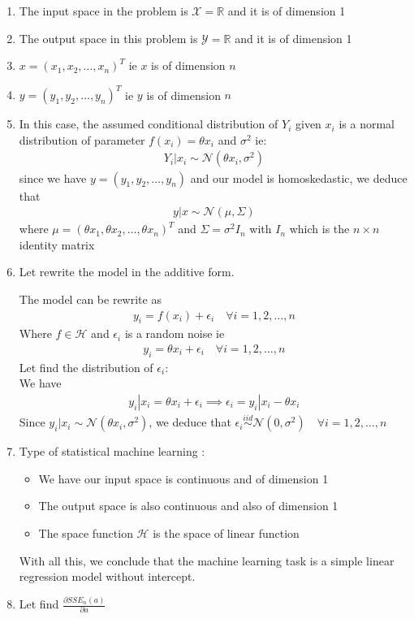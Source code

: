 \documentclass[12pt,a4paper]{article}
\begin{document}
\begin{enumerate}
	\item The input space in the problem is $\mathscr{X}=\mathbb{R}$ and it is of dimension 1
	\item The output space in this problem is $\mathscr{Y}=\mathbb{R}$ and it is of dimension 1
	\item $x = (x_{1},x_{2},\dots,x_{n})^{T}$ ie $x$ is of dimension $n$
	\item $y = (y_{1},y_{2},\dots,y_{n})^{T}$ ie $y$ is of dimension $n$
	\item In this case, the assumed conditional distribution of $Y_{i}$ given $x_{i}$ is a normal distribution of parameter $f(x_{i}) = \theta x_{i}$ and $\sigma^{2}$ ie:
	\begin{align}
		Y_{i}|x_{i}\sim\mathcal{N}(\theta x_{i},\sigma^{2})
	\end{align}
    since we have $y=(y_{1},y_{2},\dots,y_{n})$ and our model is homoskedastic, we deduce that \begin{align}
    	y|x\sim \mathcal{N}(\mu,\Sigma)
    \end{align}
where $\mu = (\theta x_{1},\theta x_{2},\dots,\theta x_{n})^{T}$ and $\Sigma = \sigma^{2}I_{n}$ with $I_{n}$ which is the $n\times n$ identity matrix

    \item Let rewrite the model in the additive form.
    
    The model can be rewrite as\begin{align}
    	y_{i} =  f(x_{i})+\epsilon_{i}\quad\forall i=1,2,\dots,n
    \end{align}
Where $f\in\mathscr{H}$ and $\epsilon_{i}$ is a random noise ie 
\begin{align}\label{13}
	y_{i} = \theta x_{i}+\epsilon_{i}\quad\forall i=1,2,\dots,n
\end{align}
Let find the distribution of $\epsilon_{i}$:\\
We have\begin{align}
	y_{i}|x_{i}  = \theta x_{i}+\epsilon_{i}\implies \epsilon_{i} = y_{i}|x_{i}-\theta x_{i}
\end{align}
Since $y_{i}|x_{i}\overset{}{}\sim\mathcal{N}(\theta x_{i},\sigma^{2})$, we deduce that $\epsilon_{i}\overset{iid}{\sim}\mathcal{N}(0,\sigma^{2})\quad\forall i=1,2,\dots,n$

\item Type of statistical machine learning :
\begin{itemize}
	\item We have our input space is continuous and of dimension 1
	\item The output space is also continuous and also of dimension 1
	\item The space function $\mathscr{H}$ is the space of linear function
\end{itemize}
With all this, we conclude that the machine learning task is a simple linear regression model without intercept.
\item Let find $\frac{\partial SSE_{n}(a)}{\partial a}$



\end{enumerate}
\end{document}
